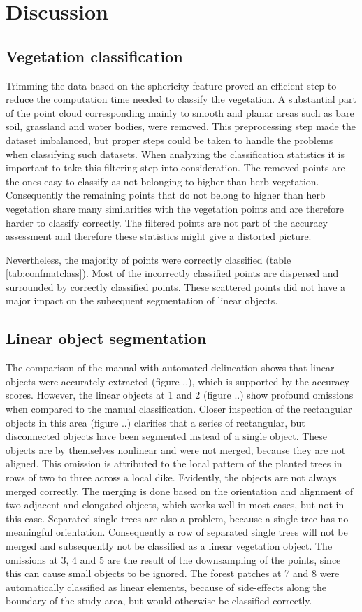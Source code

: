 \section{Discussion}
\subsection{Vegetation classification}
Trimming the data based on the sphericity feature proved an efficient step to reduce the computation time needed to classify the vegetation. A substantial part of the point cloud corresponding mainly to smooth and planar areas such as bare soil, grassland and water bodies, were removed. This preprocessing step made the dataset imbalanced, but proper steps could be taken to handle the problems when classifying such datasets. When analyzing the classification statistics it is important to take this filtering step into consideration. The removed points are the ones easy to classify as not belonging to higher than herb vegetation. Consequently the remaining points that do not belong to higher than herb vegetation share many similarities with the vegetation points and are therefore harder to classify correctly. The filtered points are not part of the accuracy assessment and therefore these statistics might give a distorted picture.

Nevertheless, the majority of points were correctly classified (table \ref{tab:confmatclass}). Most of the incorrectly classified points are dispersed and surrounded by correctly classified points. These scattered points did not have a major impact on the subsequent segmentation of linear objects. 

\subsection{Linear object segmentation}
The comparison of the manual with automated delineation shows that linear objects were accurately extracted (figure ..), which is supported by the accuracy scores. However, the linear objects at 1 and 2 (figure ..) show profound omissions when compared to the manual classification. Closer inspection of the rectangular objects in this area (figure ..) clarifies that a series of rectangular, but disconnected objects have been segmented instead of a single object. These objects are by themselves nonlinear and were not merged, because they are not aligned. This omission is attributed to the local pattern of the planted trees in rows of two to three across a local dike. Evidently, the objects are not always merged correctly. The merging is done based on the orientation and alignment of two adjacent and elongated objects, which works well in most cases, but not in this case. Separated single trees are also a problem, because a single tree has no meaningful orientation. Consequently a row of separated single trees will not be merged and subsequently not be classified as a linear vegetation object. The omissions at 3, 4 and 5 are the result of the downsampling of the points, since this can cause small objects to be ignored. The forest patches at 7 and 8 were automatically classified as linear elements, because of side-effects along the boundary of the study area, but would otherwise be classified correctly.
